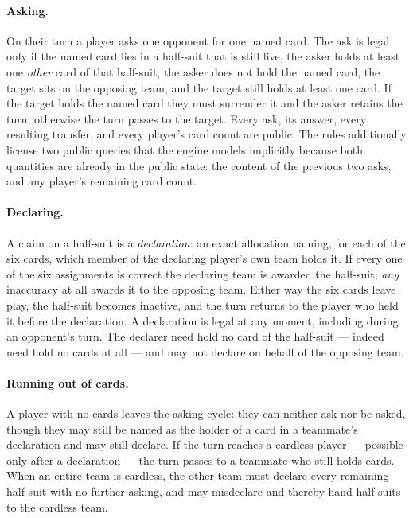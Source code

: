 \documentclass[11pt]{article}
\theoremstyle{definition}
\begin{document}
\paragraph{Asking.} On their turn a player asks one opponent for one named card.
The ask is legal only if the named card lies in a half-suit that is still live,
the asker holds at least one \emph{other} card of that half-suit, the asker does
not hold the named card, the target sits on the opposing team, and the target
still holds at least one card. If the target holds the named card they must
surrender it and the asker retains the turn; otherwise the turn passes to the
target. Every ask, its answer, every resulting transfer, and every player's card
count are public. The rules additionally license two public queries that the
engine models implicitly because both quantities are already in the public state:
the content of the previous two asks, and any player's remaining card count.

\paragraph{Declaring.} A claim on a half-suit is a \emph{declaration}: an exact
allocation naming, for each of the six cards, which member of the declaring
player's own team holds it. If every one of the six assignments is correct the
declaring team is awarded the half-suit; \emph{any} inaccuracy at all awards it
to the opposing team. Either way the six cards leave play, the half-suit becomes
inactive, and the turn returns to the player who held it before the declaration.
A declaration is legal at any moment, including during an opponent's turn. The
declarer need hold no card of the half-suit --- indeed need hold no cards at all
--- and may not declare on behalf of the opposing team.

\paragraph{Running out of cards.} A player with no cards leaves the asking cycle:
they can neither ask nor be asked, though they may still be named as the holder
of a card in a teammate's declaration and may still declare. If the turn reaches
a cardless player --- possible only after a declaration --- the turn passes to a
teammate who still holds cards. When an entire team is cardless, the other team
must declare every remaining half-suit with no further asking, and may misdeclare
and thereby hand half-suits to the cardless team.
\end{document}
